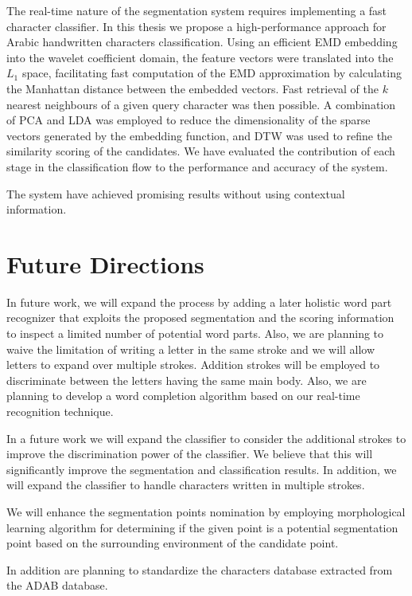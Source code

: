 The real-time nature of the segmentation system requires implementing a fast character classifier.
In this thesis we propose a high-performance approach for Arabic handwritten characters classification.
Using an efficient EMD embedding into the wavelet coefficient domain, the feature vectors were translated into the $L_1$ space, facilitating fast computation of the EMD approximation by calculating the Manhattan distance between the embedded vectors.
Fast retrieval of the $k$ nearest neighbours of a given query character was then possible.
A combination of PCA and LDA was employed to reduce the dimensionality of the sparse vectors generated by the embedding function, and DTW was used to refine the similarity scoring of the candidates.
We have evaluated the contribution of each stage in the classification flow to the performance and accuracy of the system.

The system have achieved promising results without using contextual information.

\section{Future Directions}
\label{sec:future_directions}

In future work, we will expand the process by adding a later holistic word part recognizer that exploits the proposed segmentation and the scoring information to inspect a limited number of potential word parts.
Also, we are planning to waive the limitation of writing a letter in the same stroke and we will allow letters to expand over multiple strokes.
Addition strokes will be employed to discriminate between the letters having the same main body.
Also, we are planning to develop a word completion algorithm based on our real-time recognition technique.

In a future work we will expand the classifier to consider the additional strokes to improve the discrimination power of the classifier. 
We believe that this will significantly improve the segmentation and classification results.
In addition, we will expand the classifier to handle characters written in multiple strokes.

We will enhance the segmentation points nomination by employing morphological learning algorithm for determining if the given point is a potential segmentation point based on the surrounding environment of the candidate point. 

In addition are planning to standardize the characters database extracted from the ADAB database.

%
